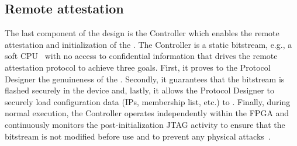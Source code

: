 \subsection{Remote attestation} 
\label{subsec:nic_controller}


 The last component of the \projecttitle{} design is the Controller which enables the remote attestation and initialization of the \projecttitle{}. The Controller is a static bitstream, e.g., a soft CPU~\cite{microblaze, nios, 10.1145/3503222.3507733} with no access to confidential information that drives the remote attestation protocol to achieve three goals. First, it proves to the Protocol Designer the genuineness of the \projecttitle{}. Secondly, it guarantees that the \projecttitle{} bitstream is flashed securely in the device and, lastly, it allows the Protocol Designer to securely load configuration data (IPs, membership list, etc.) to \projecttitle{}. Finally, during normal execution, the Controller operates independently within the FPGA and continuously monitors the post-initialization JTAG activity to ensure that the bitstream is not modified before use and to prevent any physical attacks~\cite{secMon}. 





